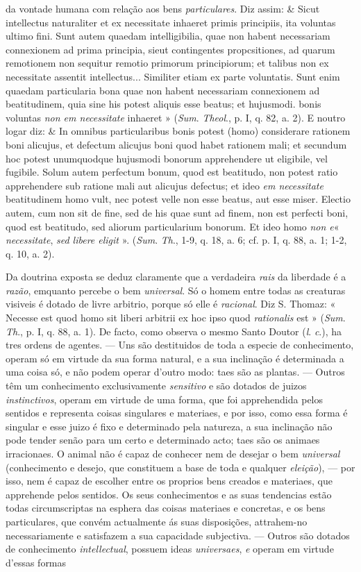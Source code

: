 da vontade humana com relação aos bens \emph{particulares}. Diz assim: \& Sicut intellectus naturaliter et ex necessitate inhaeret primis principiis, ita voluntas ultimo fini. Sunt autem quaedam intelligibilia, quae non habent necessariam connexionem ad prima principia, sieut contingentes propcsitiones, ad quarum remotionem non sequitur remotio primorum principiorum; et talibus non ex necessitate assentit intellectus... Similiter etiam ex parte voluntatis. Sunt enim quaedam particularia bona quae non habent necessariam connexionem ad beatitudinem, quia sine his potest aliquis esse beatus; et hujusmodi. bonis voluntas \emph{non em necessitate} inhaeret » (\emph{Sum}. \emph{Theol}., p. I, q. 82, a. 2). E noutro logar diz: \& In omnibus particularibus bonis potest (homo) considerare rationem boni alicujus, et defectum alicujus boni quod habet rationem mali; et secundum hoc potest unumquodque hujusmodi bonorum apprehendere ut eligibile, vel fugibile. Solum autem perfectum bonum, quod est beatitudo, non potest ratio apprehendere sub ratione mali aut alicujus defectus; et ideo \emph{em necessitate} beatitudinem homo vult, nec potest velle non esse beatus, aut esse miser. Electio autem, cum non sit de fine, sed de his quae sunt ad finem, non est perfecti boni, quod est beatitudo, sed aliorum particularium bonorum. Et ideo homo \emph{non e}« \emph{necessitate}, \emph{sed libere eligit} ». (\emph{Sum}. \emph{Th}., 1-9, q. 18, a. 6; cf. p. I, q. 88, a. 1; 1-2, q. 10, a. 2).\par Da doutrina exposta se deduz claramente que a verdadeira \emph{rais} da liberdade é a \emph{razão}, emquanto percebe o bem \emph{universal}. Só o homem entre todas as creaturas visiveis é dotado de livre arbitrio, porque só elle é \emph{racional}. Diz S. Thomaz: « Necesse est quod homo sit liberi arbitrii ex hoc ipso quod \emph{rationalis} est » (\emph{Sum}. \emph{Th}., p. I, q. 88, a. 1). De facto, como observa o mesmo Santo Doutor (\emph{l}. \emph{c}.), ha tres ordens de agentes. --- Uns são destituidos de toda a especie de conhecimento, operam só em virtude da sua forma natural, e a sua inclinação é determinada a uma coisa só, e não podem operar d'outro modo: taes são as plantas. --- Outros têm um conhecimento exclusivamente \emph{sensitivo} e são dotados de juizos \emph{instinctivos}, operam em virtude de uma forma, que foi apprehendida pelos sentidos e representa coisas singulares e materiaes, e por isso, como essa forma é singular e esse juizo é fixo e determinado pela natureza, a sua inclinação não pode tender senão para um certo e determinado acto; taes são os animaes irracionaes. O animal não é capaz de conhecer nem de desejar o bem \emph{universal} (conhecimento e desejo, que constituem a base de toda e qualquer \emph{eleição}), --- por isso, nem é capaz de escolher entre os proprios bens creados e materiaes, que apprehende pelos sentidos. Os seus conhecimentos e as suas tendencias estão todas circumscriptas na esphera das coisas materiaes e concretas, e os bens particulares, que convém actualmente ás suas disposições, attrahem-no necessariamente e satisfazem a sua capacidade subjectiva. --- Outros são dotados de conhecimento \emph{intellectual}, possuem ideas \emph{universaes}, \emph{e} operam em virtude d'essas formas 